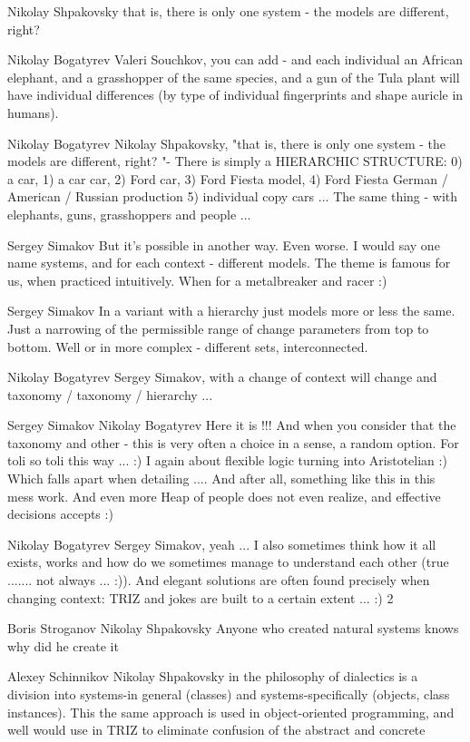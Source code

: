 \documentclass[11pt,a4paper]{article}
\begin{document}
Nikolay Shpakovsky that is, there is only one system - the models are
different, right?

Nikolay Bogatyrev Valeri Souchkov, you can add - and each individual an
African elephant, and a grasshopper of the same species, and a gun of the Tula
plant will have individual differences (by type of individual fingerprints and
shape auricle in humans).

Nikolay Bogatyrev Nikolay Shpakovsky, "that is, there is only one system - the
models are different, right? "- There is simply a HIERARCHIC STRUCTURE: 0) a
car, 1) a car car, 2) Ford car, 3) Ford Fiesta model, 4) Ford Fiesta German /
American / Russian production 5) individual copy cars ... The same thing -
with elephants, guns, grasshoppers and people ...

Sergey Simakov But it’s possible in another way. Even worse. I would say one
name systems, and for each context - different models. The theme is famous for
us, when practiced intuitively. When for a metalbreaker and racer :)

Sergey Simakov In a variant with a hierarchy just models more or less the
same. Just a narrowing of the permissible range of change parameters from top
to bottom. Well or in more complex - different sets, interconnected.

Nikolay Bogatyrev Sergey Simakov, with a change of context will change and
taxonomy / taxonomy / hierarchy ...

Sergey Simakov Nikolay Bogatyrev Here it is !!! And when you consider that the
taxonomy and other - this is very often a choice in a sense, a random
option. For toli so toli this way ... :) I again about flexible logic turning
into Aristotelian :) Which falls apart when detailing .... And after all,
something like this in this mess work. And even more Heap of people does not
even realize, and effective decisions accepts :)

Nikolay Bogatyrev Sergey Simakov, yeah ... I also sometimes think how it all
exists, works and how do we sometimes manage to understand each other (true
....... not always ... :)). And elegant solutions are often found precisely
when changing context: TRIZ and jokes are built to a certain extent ... :) 2

Boris Stroganov Nikolay Shpakovsky Anyone who created natural systems knows
why did he create it

Alexey Schinnikov Nikolay Shpakovsky in the philosophy of dialectics is a
division into systems-in general (classes) and systems-specifically (objects,
class instances). This the same approach is used in object-oriented
programming, and well would use in TRIZ to eliminate confusion of the abstract
and concrete 
\end{document}
